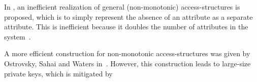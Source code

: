In \cite{goyal_attribute-based_2006}, an inefficient realization of general (non-monotonic) \glspl{access-structure} is proposed, which is to simply represent the absence of an attribute as a separate attribute.
This is inefficient because it doubles the number of attributes in the system~\cite{goyal_attribute-based_2006}.

A more efficient construction for non-monotonic \glspl{access-structure} was given by Ostrovsky, Sahai and Waters in~\cite{ostrovsky_attribute-based_2007}. 
However, this construction leads to large-size private keys, which is mitigated by 

